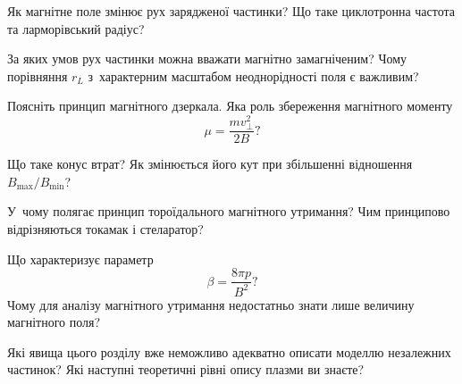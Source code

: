 \begin{Questions}
\begin{quizlist}
		\item Як магнітне поле змінює рух зарядженої частинки? Що таке циклотронна частота та ларморівський радіус?

		\item За яких умов рух частинки можна вважати магнітно замагніченим? Чому порівняння $r_L$ з~характерним масштабом неоднорідності поля є важливим?

		\item Поясніть принцип магнітного дзеркала. Яка роль збереження магнітного моменту
		\begin{equation*}
			\mu=\frac{m v_\perp^2}{2B}?
		\end{equation*}

		\item Що таке конус втрат? Як змінюється його кут при збільшенні відношення $B_{\max}/B_{\min}$?

		\item У~чому полягає принцип тороїдального магнітного утримання? Чим принципово відрізняються токамак і стеларатор?

		\item Що характеризує параметр
		\begin{equation*}
			\beta=\frac{8\pi p}{B^2}?
		\end{equation*}
		Чому для аналізу магнітного утримання недостатньо знати лише величину магнітного поля?

		\item Які явища цього розділу вже неможливо адекватно описати моделлю незалежних частинок? Які наступні теоретичні рівні опису плазми ви знаєте?
	\end{quizlist}
\end{Questions}